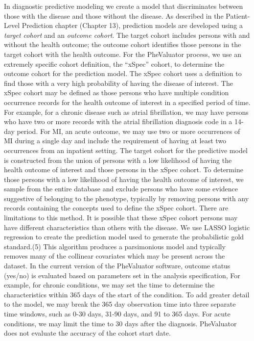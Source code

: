 \documentclass[
  letterpaper,
  paper=7in:10in,
  pagesize=pdftex,
  headinclude=on,
  footinclude=on,
  12pt]{scrbook}
\begin{document}
In diagnostic predictive modeling we create a model that discriminates
between those with the disease and those without the disease. As
described in the Patient-Level Prediction chapter (Chapter 13),
prediction models are developed using a \emph{target cohort} and an
\emph{outcome cohort}. The target cohort includes persons with and
without the health outcome; the outcome cohort identifies those persons
in the target cohort with the health outcome. For the PheValuator
process, we use an extremely specific cohort definition, the ``xSpec''
cohort, to determine the outcome cohort for the prediction model. The
xSpec cohort uses a definition to find those with a very high
probability of having the disease of interest. The xSpec cohort may be
defined as those persons who have multiple condition occurrence records
for the health outcome of interest in a specified period of time. For
example, for a chronic disease such as atrial fibrillation, we may have
persons who have two or more records with the atrial fibrillation
diagnosis code in a 14-day period. For MI, an acute outcome, we may use
two or more occurrences of MI during a single day and include the
requirement of having at least two occurrences from an inpatient
setting. The target cohort for the predictive model is constructed from
the union of persons with a low likelihood of having the health outcome
of interest and those persons in the xSpec cohort. To determine those
persons with a low likelihood of having the health outcome of interest,
we sample from the entire database and exclude persons who have some
evidence suggestive of belonging to the phenotype, typically by removing
persons with any records containing the concepts used to define the
xSpec cohort. There are limitations to this method. It is possible that
these xSpec cohort persons may have different characteristics than
others with the disease. We use LASSO logistic regression to create the
prediction model used to generate the probabilistic gold standard.(5)
This algorithm produces a parsimonious model and typically removes many
of the collinear covariates which may be present across the dataset. In
the current version of the PheValuator software, outcome status (yes/no)
is evaluated based on parameters set in the analysis specification, For
example, for chronic conditions, we may set the time to determine the
characteristics within 365 days of the start of the condition. To add
greater detail to the model, we may break the 365 day observation time
into three separate time windows, such as 0-30 days, 31-90 days, and 91
to 365 days. For acute conditions, we may limit the time to 30 days
after the diagnosis. PheValuator does not evaluate the accuracy of the
cohort start date.
\end{document}
